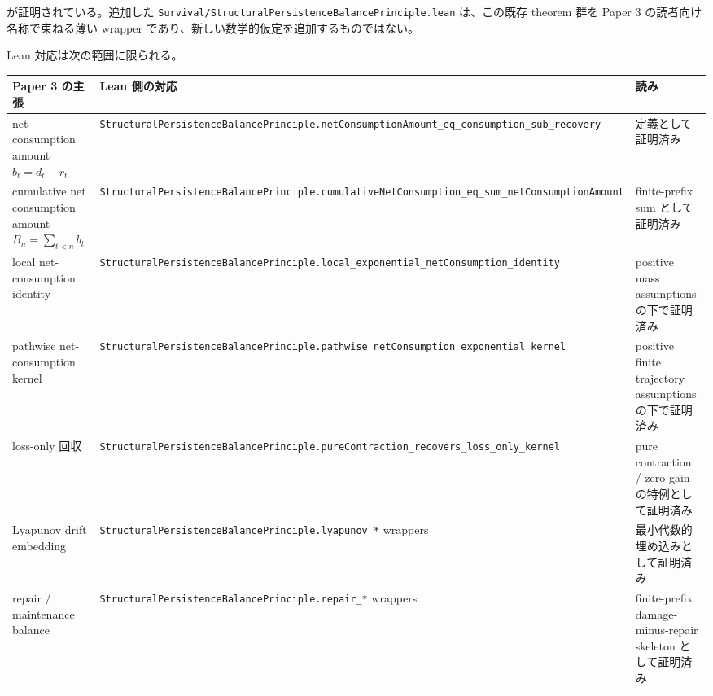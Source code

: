 \documentclass[12pt,a4paper]{article}
\begin{document}
が証明されている。追加した \texttt{Survival/StructuralPersistenceBalancePrinciple.lean} は、この既存 theorem 群を Paper 3 の読者向け名称で束ねる薄い wrapper であり、新しい数学的仮定を追加するものではない。

Lean 対応は次の範囲に限られる。

{\def\LTcaptype{table} %
\begin{longtable}[]{@{}
  >{\raggedright\arraybackslash}p{}
  >{\raggedright\arraybackslash}p{}
  >{\raggedright\arraybackslash}p{}@{}}
\toprule\noalign{}
\begin{minipage}[b]{\linewidth}\raggedright
Paper 3 の主張
\end{minipage} & \begin{minipage}[b]{\linewidth}\raggedright
Lean 側の対応
\end{minipage} & \begin{minipage}[b]{\linewidth}\raggedright
読み
\end{minipage} \\
\midrule\noalign{}
\endhead
\bottomrule\noalign{}
\endlastfoot
net consumption amount \(b_t=d_t-r_t\) & \texttt{StructuralPersistenceBalancePrinciple.netConsumptionAmount\_eq\_consumption\_sub\_recovery} & 定義として証明済み \\
cumulative net consumption amount \(B_n=\sum_{t<n}b_t\) & \texttt{StructuralPersistenceBalancePrinciple.cumulativeNetConsumption\_eq\_sum\_netConsumptionAmount} & finite-prefix sum として証明済み \\
local net-consumption identity & \texttt{StructuralPersistenceBalancePrinciple.local\_exponential\_netConsumption\_identity} & positive mass assumptions の下で証明済み \\
pathwise net-consumption kernel & \texttt{StructuralPersistenceBalancePrinciple.pathwise\_netConsumption\_exponential\_kernel} & positive finite trajectory assumptions の下で証明済み \\
loss-only 回収 & \texttt{StructuralPersistenceBalancePrinciple.pureContraction\_recovers\_loss\_only\_kernel} & pure contraction / zero gain の特例として証明済み \\
Lyapunov drift embedding & \texttt{StructuralPersistenceBalancePrinciple.lyapunov\_*} wrappers & 最小代数的埋め込みとして証明済み \\
repair / maintenance balance & \texttt{StructuralPersistenceBalancePrinciple.repair\_*} wrappers & finite-prefix damage-minus-repair skeleton として証明済み \\
\end{longtable}
}
\end{document}
